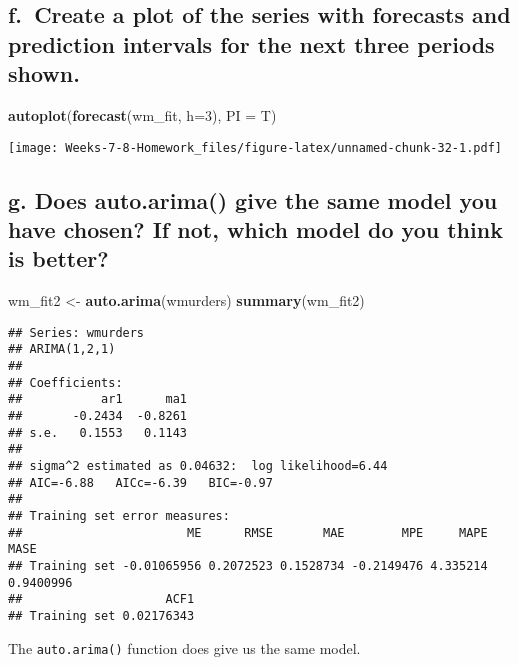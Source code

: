 \documentclass[]{article}
\newenvironment{Shaded}{\begin{snugshade}}{\end{snugshade}}
\newcommand{\DataTypeTok}[1]{\textcolor[rgb]{0.13,0.29,0.53}{#1}}
\newcommand{\DecValTok}[1]{\textcolor[rgb]{0.00,0.00,0.81}{#1}}
\newcommand{\KeywordTok}[1]{\textcolor[rgb]{0.13,0.29,0.53}{\textbf{#1}}}
\newcommand{\NormalTok}[1]{#1}
\newcommand{\StringTok}[1]{\textcolor[rgb]{0.31,0.60,0.02}{#1}}
\begin{document}
\hypertarget{f.-create-a-plot-of-the-series-with-forecasts-and-prediction-intervals-for-the-next-three-periods-shown.}{%
\subsection{f.~Create a plot of the series with forecasts and prediction
intervals for the next three periods
shown.}\label{f.-create-a-plot-of-the-series-with-forecasts-and-prediction-intervals-for-the-next-three-periods-shown.}}

\begin{Shaded}
\begin{Highlighting}[]
\KeywordTok{autoplot}\NormalTok{(}\KeywordTok{forecast}\NormalTok{(wm_fit, }\DataTypeTok{h=}\DecValTok{3}\NormalTok{), }\DataTypeTok{PI =}\NormalTok{ T)}
\end{Highlighting}
\end{Shaded}

\texttt{[image: Weeks-7-8-Homework\_files/figure-latex/unnamed-chunk-32-1.pdf]}

\hypertarget{g.-does-auto.arima-give-the-same-model-you-have-chosen-if-not-which-model-do-you-think-is-better}{%
\subsection{g. Does auto.arima() give the same model you have chosen? If
not, which model do you think is
better?}\label{g.-does-auto.arima-give-the-same-model-you-have-chosen-if-not-which-model-do-you-think-is-better}}

\begin{Shaded}
\begin{Highlighting}[]
\NormalTok{wm_fit2 <-}\StringTok{ }\KeywordTok{auto.arima}\NormalTok{(wmurders)}
\KeywordTok{summary}\NormalTok{(wm_fit2)}
\end{Highlighting}
\end{Shaded}

\begin{verbatim}
## Series: wmurders 
## ARIMA(1,2,1) 
## 
## Coefficients:
##           ar1      ma1
##       -0.2434  -0.8261
## s.e.   0.1553   0.1143
## 
## sigma^2 estimated as 0.04632:  log likelihood=6.44
## AIC=-6.88   AICc=-6.39   BIC=-0.97
## 
## Training set error measures:
##                       ME      RMSE       MAE        MPE     MAPE      MASE
## Training set -0.01065956 0.2072523 0.1528734 -0.2149476 4.335214 0.9400996
##                    ACF1
## Training set 0.02176343
\end{verbatim}

The \texttt{auto.arima()} function does give us the same model.
\end{document}

